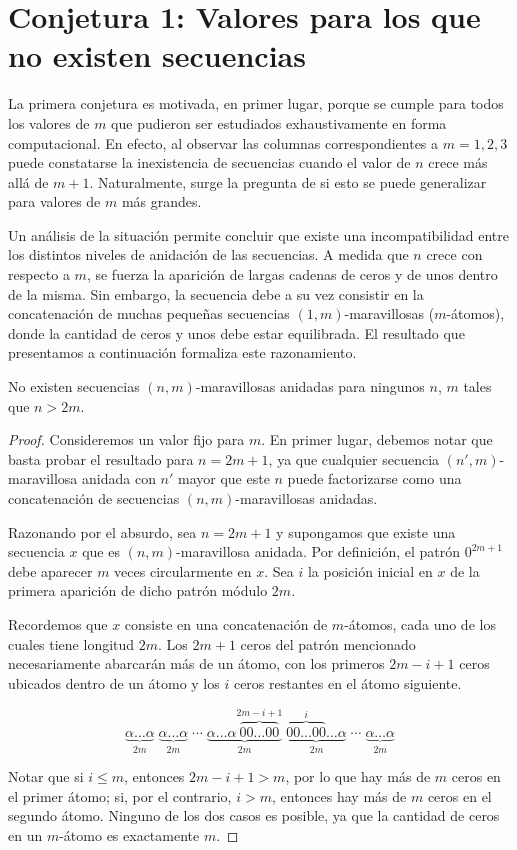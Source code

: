 \section{Conjetura 1: Valores para los que no existen secuencias}

La primera conjetura es motivada, en primer lugar, porque se cumple para todos
los valores de $m$ que pudieron ser estudiados exhaustivamente en forma
computacional.
En efecto, al observar las columnas correspondientes a $m = 1, 2, 3$ puede
constatarse la inexistencia de secuencias cuando el valor de $n$ crece
más allá de $m + 1$. Naturalmente, surge la pregunta de si esto se puede
generalizar para valores de $m$ más grandes.

Un análisis de la situación permite concluir que existe una
incompatibilidad entre los distintos niveles de anidación de las secuencias.
A medida que $n$ crece con respecto a $m$, se fuerza la aparición de largas
cadenas de ceros y de unos dentro de la misma. Sin embargo, la secuencia debe
a su vez consistir en la concatenación de muchas pequeñas secuencias
$(1,m)$-maravillosas ($m$-átomos), donde la cantidad de ceros y unos debe estar
equilibrada.
El resultado que presentamos a continuación formaliza este razonamiento.

\begin{proposition}
	No existen secuencias $(n,m)$-maravillosas anidadas para ningunos $n$, $m$
	tales que $n > 2m$.
\end{proposition}

\begin{proof}
	Consideremos un valor fijo para $m$.
	En primer lugar, debemos notar que basta probar el resultado para $n = 2m +
		1$, ya que cualquier secuencia $(n',m)$-maravillosa anidada con $n'$ mayor
		que este $n$ puede factorizarse como una concatenación de secuencias
	$(n,m)$-maravillosas anidadas.

		Razonando por el absurdo, sea $n = 2m + 1$ y supongamos que existe una
	secuencia $x$ que es $(n,m)$-maravillosa anidada.
	Por definición, el patrón $0^{2m+1}$ debe aparecer $m$ veces circularmente
	en $x$. Sea $i$ la posición inicial en $x$ de la primera aparición de dicho
	patrón módulo $2m$.

	Recordemos que $x$ consiste en una concatenación de $m$-átomos, cada uno de
	los cuales tiene longitud $2m$. Los $2m+1$ ceros del patrón mencionado
	necesariamente abarcarán más de un átomo, con los primeros $2m - i + 1$ ceros
	ubicados dentro de un átomo y los $i$ ceros restantes en el átomo
	siguiente.

	\[ \underbrace{\alpha\dots\alpha}_{2m}
		\; \underbrace{\alpha\dots\alpha}_{2m} \; \cdots
		\; \underbrace{\alpha\dots\alpha\overbrace{00\dots00}^{2m-i+1}}_{2m}
		\; \underbrace{\overbrace{00\dots00}^{i}\dots\alpha}_{2m} \; \cdots
		\; \underbrace{\alpha\dots\alpha}_{2m} \]

	Notar que si $i \leq m$, entonces $2m - i + 1 > m$, por lo que hay
	más de $m$ ceros en el primer átomo; si, por el contrario, $i > m$, entonces
	hay más de $m$ ceros en el segundo átomo. Ninguno
	de los dos casos es posible, ya que la cantidad de ceros en un $m$-átomo es
	exactamente $m$.
\end{proof}


